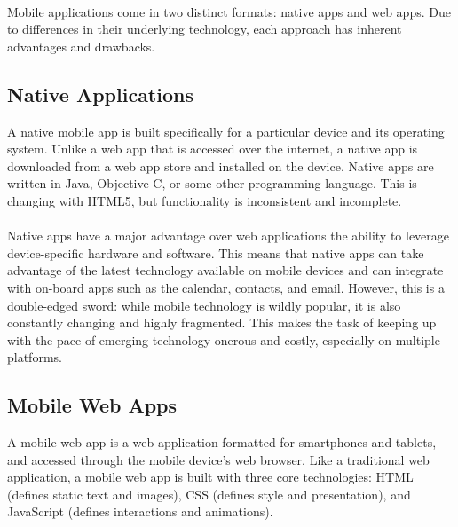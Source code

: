 \paragraph{}
Mobile applications come in two distinct formats: native apps and web apps. Due to differences in their underlying technology, each approach has inherent advantages and drawbacks.


\subsection{Native Applications}

A native mobile app is built specifically for a particular device and its operating system. Unlike a web app that is accessed over the internet, a native app is downloaded from a web app store and installed on the device. Native apps are written in Java, Objective C, or some other programming language. This is changing with HTML5, but functionality is inconsistent and incomplete.


\paragraph{}

Native apps have a major advantage over web applications the ability to leverage device-specific hardware and software. This means that native apps can take advantage of the latest technology available on mobile devices and can integrate with on-board apps such as the calendar, contacts, and email. However, this is a double-edged sword: while mobile technology is wildly popular, it is also constantly changing and highly fragmented. This makes the task of keeping up with the pace of emerging technology onerous and costly, especially on multiple platforms.



\subsection{Mobile Web Apps}

A mobile web app is a web application formatted for smartphones and tablets, and accessed through the mobile device’s web browser. Like a traditional web application, a mobile web app is built with three core technologies: HTML (defines static text and images), CSS (defines style and presentation), and JavaScript (defines interactions and animations).



